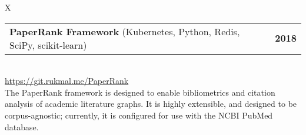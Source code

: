 \documentclass[10pt]{article}
\newcommand{\tabularxwidth}{\textwidth}
\begin{document}
        \begin{tabularx}{\tabularxwidth}{X}
                {
                    \begin{tabularx}{\tabularxwidth}{@{}X r}
                        \textbf{PaperRank Framework}
                            (Kubernetes, Python, Redis, SciPy, scikit-learn)
                        &
                        \textbf{
        2018} \\
                    \end{tabularx}
                } \\

            

            

            
                \url{https://git.rukmal.me/PaperRank} \\
            

            
    The PaperRank framework is designed to enable bibliometrics and citation analysis of academic literature graphs. It is highly extensible, and designed to be corpus-agnostic; currently, it is configured for use with the NCBI PubMed database. \\

        \end{tabularx}

        
            \vspace{.5em}
        

    
\end{document}
